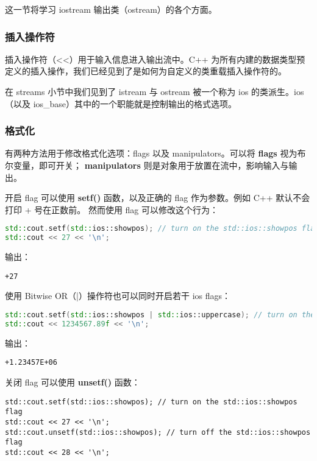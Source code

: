 \documentclass[../../LearnCpp.tex]{subfiles}
\begin{document}

这一节将学习 iostream 输出类（ostream）的各个方面。

\subsubsection*{插入操作符}

插入操作符（<<）用于输入信息进入输出流中。C++ 为所有内建的数据类型预定义的插入操作，我们已经见到了是如何为自定义的类重载插入操作符的。

在 streams 小节中我们见到了 istream 与 ostream 被一个称为 ios 的类派生。ios（以及 ios\_base）其中的一个职能就是控制输出的格式选项。

\subsubsection*{格式化}

有两种方法用于修改格式化选项：flags 以及 manipulators。可以将 \textbf{flags} 视为布尔变量，即可开关；
\textbf{manipulators} 则是对象用于放置在流中，影响输入与输出。

开启 flag 可以使用 \textbf{setf()} 函数，以及正确的 flag 作为参数。例如 C++ 默认不会打印 + 号在正数前。
然而使用  flag 可以修改这个行为：

\begin{lstlisting}[language=C++]
std::cout.setf(std::ios::showpos); // turn on the std::ios::showpos flag
std::cout << 27 << '\n';
\end{lstlisting}

输出：

\begin{lstlisting}
+27
\end{lstlisting}

使用 Bitwise OR（|）操作符也可以同时开启若干 ios flags：

\begin{lstlisting}[language=C++]
std::cout.setf(std::ios::showpos | std::ios::uppercase); // turn on the std::ios::showpos and std::ios::uppercase flag
std::cout << 1234567.89f << '\n';
\end{lstlisting}

输出：

\begin{lstlisting}
+1.23457E+06
\end{lstlisting}

关闭 flag 可以使用 \textbf{unsetf()} 函数：

\begin{lstlisting}
std::cout.setf(std::ios::showpos); // turn on the std::ios::showpos flag
std::cout << 27 << '\n';
std::cout.unsetf(std::ios::showpos); // turn off the std::ios::showpos flag
std::cout << 28 << '\n';
\end{lstlisting}
\end{document}
